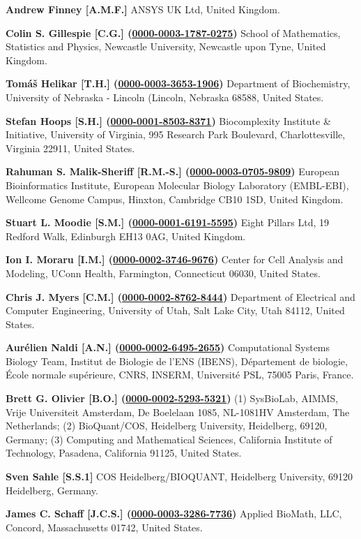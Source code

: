 \documentclass{sbml-paper}
\newcommand{\orcid}[1]{\href{https://orcid.org/#1}{#1}}
\begin{document}
\textbf{Andrew Finney [A.M.F.]} ANSYS UK Ltd, United Kingdom.
	
\textbf{Colin S. Gillespie [C.G.] (\orcid{0000-0003-1787-0275})} School of Mathematics, Statistics and Physics, Newcastle University, Newcastle upon Tyne, United Kingdom.

\textbf{Tomáš Helikar [T.H.] (\orcid{0000-0003-3653-1906})} Department of Biochemistry, University of Nebraska - Lincoln (Lincoln, Nebraska 68588, United States.

\textbf{Stefan Hoops [S.H.] (\orcid{0000-0001-8503-8371})} Biocomplexity Institute \& Initiative, University of Virginia, 995 Research Park Boulevard, Charlottesville, Virginia 22911, United States.

\textbf{Rahuman S. Malik-Sheriff [R.M.-S.] (\orcid{0000-0003-0705-9809})} European Bioinformatics Institute, European Molecular Biology Laboratory (EMBL-EBI), Wellcome Genome Campus, Hinxton, Cambridge CB10 1SD, United Kingdom.

\textbf{Stuart L. Moodie [S.M.] (\orcid{0000-0001-6191-5595})} Eight Pillars Ltd, 19 Redford Walk, Edinburgh EH13 0AG, United Kingdom.

\textbf{Ion I. Moraru [I.M.] (\orcid{0000-0002-3746-9676})} Center for Cell Analysis and Modeling, UConn Health, Farmington, Connecticut 06030, United States.

\textbf{Chris J. Myers [C.M.] (\orcid{0000-0002-8762-8444})} Department of Electrical and Computer Engineering, University of Utah, Salt Lake City, Utah 84112, United States.

\textbf{Aurélien Naldi [A.N.] (\orcid{0000-0002-6495-2655})} Computational Systems Biology Team, Institut de Biologie de l’ENS (IBENS), Département de biologie, École normale supérieure, CNRS, INSERM, Université PSL, 75005 Paris, France.

\textbf{Brett G. Olivier [B.O.] (\orcid{0000-0002-5293-5321})} (1) SysBioLab, AIMMS, Vrije Universiteit Amsterdam, De Boelelaan 1085, NL-1081HV Amsterdam, The Netherlands; (2) BioQuant/COS, Heidelberg University, Heidelberg, 69120, Germany; (3) Computing and Mathematical Sciences, California Institute of Technology, Pasadena, California 91125, United States.

\textbf{Sven Sahle [S.S.1]} COS Heidelberg/BIOQUANT,  Heidelberg University, 69120 Heidelberg, Germany.

\textbf{James C. Schaff [J.C.S.] (\orcid{0000-0003-3286-7736})} Applied BioMath, LLC, Concord, Massachusetts 01742, United States.
\end{document}
